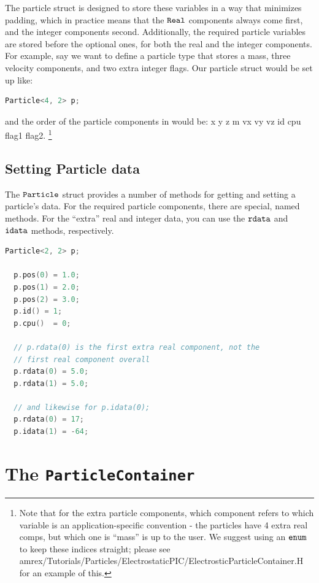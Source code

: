 The particle struct is designed to store these variables in a way that minimizes padding, which in practice means that the $\tt{Real}$ components always come first, and the integer components second. Additionally, the required particle variables are stored before the optional ones, for both the real and the integer components. For example, say we want to define a particle type that stores a mass, three velocity components, and two extra integer flags. Our particle struct would be set up like:

\begin{lstlisting}[language=cpp]
  Particle<4, 2> p;
\end{lstlisting}

and the order of the particle components in would be: x y z m vx vy vz id cpu flag1 flag2. \footnote{Note that for the extra particle components, which component refers to which
variable is an application-specific convention - the particles have 4 extra real comps, but which one is ``mass'' is up to the user. We suggest using an $\tt{enum}$ to keep these indices straight; please see amrex/Tutorials/Particles/ElectrostaticPIC/ElectrosticParticleContainer.H for an example of this.} 

\subsection{Setting Particle data}

The $\tt{Particle}$ struct provides a number of methods for getting and setting a particle's data. For the required particle components, there are special, named methods. For the 
``extra'' real and integer data, you can use the $\tt{rdata}$ and $\tt{idata}$ methods, respectively. 

\begin{lstlisting}[language=cpp]
  Particle<2, 2> p;

  p.pos(0) = 1.0;
  p.pos(1) = 2.0;
  p.pos(2) = 3.0;
  p.id() = 1;
  p.cpu()  = 0;

  // p.rdata(0) is the first extra real component, not the 
  // first real component overall
  p.rdata(0) = 5.0;
  p.rdata(1) = 5.0;

  // and likewise for p.idata(0);
  p.rdata(0) = 17;
  p.idata(1) = -64;  
\end{lstlisting}

\section{The \tt{ParticleContainer}}
\label{sec:Particles:ParticleContainer}
 
